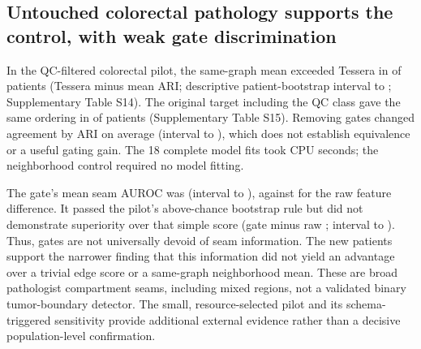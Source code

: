 \documentclass[11pt]{article}
\begin{document}
\subsection{Untouched colorectal pathology supports the control, with weak gate discrimination}
In the QC-filtered colorectal pilot, the same-graph mean exceeded Tessera in \CrcTessMeanNeg{} of \CrcPatients{} patients (Tessera minus mean \CrcTessMeanDelta{} ARI; descriptive patient-bootstrap interval \CrcTessMeanLow{} to \CrcTessMeanHigh{}; Supplementary Table S14). The original target including the QC class gave the same ordering in \CrcRawTessMeanNeg{} of \CrcPatients{} patients (Supplementary Table S15). Removing gates changed agreement by \CrcNoGateDelta{} ARI on average (interval \CrcNoGateLow{} to \CrcNoGateHigh{}), which does not establish equivalence or a useful gating gain. The 18 complete model fits took \CrcFitSeconds{} CPU seconds; the neighborhood control required no model fitting.

The gate's mean seam AUROC was \CrcGate{} (interval \CrcGateLow{} to \CrcGateHigh{}), against \CrcRaw{} for the raw feature difference. It passed the pilot's above-chance bootstrap rule but did not demonstrate superiority over that simple score (gate minus raw \CrcGateRawDelta{}; interval \CrcGateRawLow{} to \CrcGateRawHigh{}). Thus, gates are not universally devoid of seam information. The new patients support the narrower finding that this information did not yield an advantage over a trivial edge score or a same-graph neighborhood mean. These are broad pathologist compartment seams, including mixed regions, not a validated binary tumor-boundary detector. The small, resource-selected pilot and its schema-triggered sensitivity provide additional external evidence rather than a decisive population-level confirmation.





\end{document}
